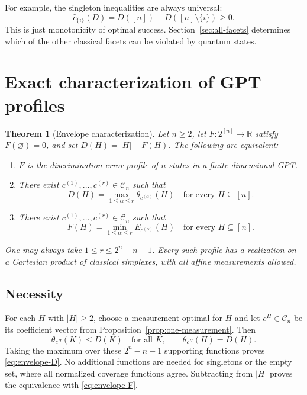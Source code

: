 \documentclass[10pt,a4paper]{amsart}
\newtheorem{theorem}{Theorem}[section]
\newcommand{\R}{\mathbb R}
\newcommand{\1}{\mathbf 1}
\newcommand{\Coeff}{\mathcal C}
\begin{document}
For example, the singleton inequalities are always universal:
\begin{equation}\label{eq:singleton-universal}
 \widehat c_{\{i\}}(D)=D([n])-D([n]\setminus\{i\})\ge0.
\end{equation}
This is just monotonicity of optimal success. Section~\ref{sec:all-facets}
determines which of the other classical facets can be violated by quantum
states.

\section{Exact characterization of GPT profiles}\label{sec:envelope}

\begin{theorem}[Envelope characterization]\label{thm:envelope}
Let $n\ge2$, let $F:2^{[n]}\to\R$ satisfy $F(\varnothing)=0$, and set
$D(H)=|H|-F(H)$. The following are equivalent:
\begin{enumerate}[label=(\roman*)]
\item $F$ is the discrimination-error profile of $n$ states in a
finite-dimensional GPT.
\item There exist $c^{(1)},\ldots,c^{(r)}\in\Coeff_n$ such that
\begin{equation}\label{eq:envelope-D}
 D(H)=\max_{1\le\alpha\le r}\theta_{c^{(\alpha)}}(H)
 \quad\text{for every }H\subseteq[n].
\end{equation}
\item There exist $c^{(1)},\ldots,c^{(r)}\in\Coeff_n$ such that
\begin{equation}\label{eq:envelope-F}
 F(H)=\min_{1\le\alpha\le r}E_{c^{(\alpha)}}(H)
 \quad\text{for every }H\subseteq[n].
\end{equation}
\end{enumerate}
One may always take $1\le r\le2^n-n-1$. Every such profile has a realization
on a Cartesian product of classical simplexes, with all affine measurements
allowed.
\end{theorem}

\subsection{Necessity}

For each $H$ with $|H|\ge2$, choose a measurement optimal for $H$ and let
$c^H\in\Coeff_n$ be its coefficient vector from
Proposition~\ref{prop:one-measurement}. Then
\[
 \theta_{c^H}(K)\le D(K)\quad\text{for all }K,
 \qquad\theta_{c^H}(H)=D(H).
\]
Taking the maximum over these $2^n-n-1$ supporting functions proves
\eqref{eq:envelope-D}. No additional functions are needed for singletons or the
empty set, where all normalized coverage functions agree. Subtracting from
$|H|$ proves the equivalence with \eqref{eq:envelope-F}.
\end{document}
